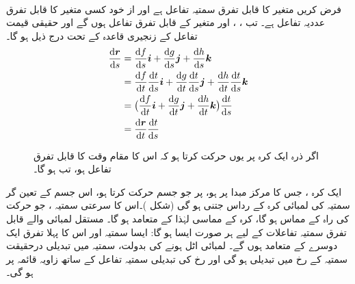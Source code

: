 \\
فرض کریں  متغیر  کا قابل تفرق سمتیہ  تفاعل ہے اور  از خود کسی متغیر  کا قابل تفرق عددیہ تفاعل ہے۔ تب ، ،  اور  متغیر  کے قابل تفرق تفاعل ہوں گے  اور حقیقی قیمت تفاعل کے زنجیری قاعدہ کے تحت درج ذیل ہو گا۔
\begin{align*}
\frac{\dif \kvec{r}}{\dif s}&=\frac{\dif f}{\dif s}\ai+\frac{\dif g}{\dif s}\aj+\frac{\dif h}{\dif s}\ak\\
&=\frac{\dif f}{\dif t}\frac{\dif t}{\dif s}\ai+\frac{\dif g}{\dif t}\frac{\dif t}{\dif s}\aj+\frac{\dif h}{\dif t}\frac{\dif t}{\dif s}\ak\\
&=\big(\frac{\dif f}{\dif t}\ai+\frac{\dif g}{\dif t}\aj+\frac{\dif h}{\dif t}\ak\big)\frac{\dif t}{\dif s}\\
&=\frac{\dif \kvec{r}}{\dif t}\frac{\dif t}{\dif s}
\end{align*}

\begin{figure}
\centering
{}
\caption
{اگر  ذرہ ایک کرہ پر یوں حرکت کرتا ہو کہ اس کا مقام  وقت کا قابل تفرق تفاعل ہو، تب  ہو گا۔}
\label{شکل_سمتی_تفاعل_مستقل_لمبائی}
\end{figure}

 ایک کرہ   ، جس کا مرکز مبدا پر ہو، پر  جو جسم حرکت کرتا ہو، اس جسم  کے  تعین گر سمتیہ کی لمبائی   کرہ کے رداس جتنی ہو گی  (شکل )۔اس کا سرعتی سمتیہ  ،  جو حرکت کی راہ کے مماس ہو گا،  کرہ کے  مماسی   لہٰذا     کے  متعامد  ہو گا۔ مستقل لمبائی والے قابل تفرق سمتیہ  تفاعلات کے لیے  ہر صورت ایسا  ہو گا:   ایسا  سمتیہ اور اس کا پہلا تفرق ایک دوسرے کے متعامد  ہوں گے۔ لمبائی اٹل ہونے کی بدولت، سمتیہ میں تبدیلی درحقیقت سمتیہ کے رخ میں تبدیلی ہو گی اور رخ کی   تبدیلی سمتیہ  تفاعل کے ساتھ  زاویہ قائمہ پر ہو گی۔

